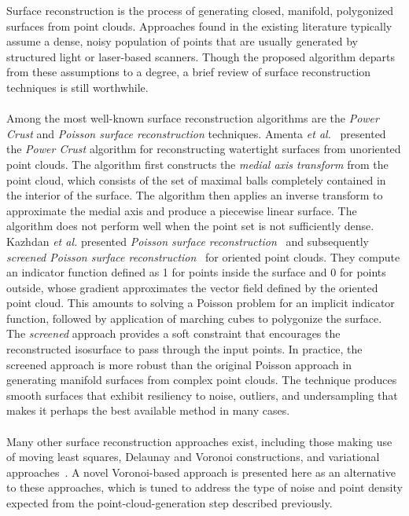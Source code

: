Surface reconstruction is the process of generating closed, manifold, polygonized surfaces from point clouds. Approaches found in the existing literature typically assume a dense, noisy population of points that are usually generated by structured light or laser-based scanners. Though the proposed algorithm departs from these assumptions to a degree, a brief review of surface reconstruction techniques is still worthwhile. \\ \\
%
Among the most well-known surface reconstruction algorithms are the \textit{Power Crust} and \textit{Poisson surface reconstruction} techniques. Amenta \textit{et al.}~\cite{amenta_2001} presented the \textit{Power Crust} algorithm for reconstructing watertight surfaces from unoriented point clouds. The algorithm first constructs the \textit{medial axis transform} from the point cloud, which consists of the set of maximal balls completely contained in the interior of the surface. The algorithm then applies an inverse transform to approximate the medial axis and produce a piecewise linear surface. The algorithm does not perform well when the point set is not sufficiently dense. Kazhdan \textit{et al.} presented \textit{Poisson surface reconstruction}~\cite{kazhdan_2008} and subsequently \textit{screened Poisson surface reconstruction}~\cite{kazhdan_2013} for oriented point clouds. They compute an indicator function defined as 1 for points inside the surface and 0 for points outside, whose gradient approximates the vector field defined by the oriented point cloud. This amounts to solving a Poisson problem for an implicit indicator function, followed by application of marching cubes to polygonize the surface. The \textit{screened} approach provides a soft constraint that encourages the reconstructed isosurface to pass through the input points. In practice, the screened approach is more robust than the original Poisson approach in generating manifold surfaces from complex point clouds. The technique produces smooth surfaces that exhibit resiliency to noise, outliers, and undersampling that makes it perhaps the best available method in many cases. \\ \\
%
Many other surface reconstruction approaches exist, including those making use of moving least squares, Delaunay and Voronoi constructions, and variational approaches~\cite{berger}. A novel Voronoi-based approach is presented here as an alternative to these approaches, which is tuned to address the type of noise and point density expected from the point-cloud-generation step described previously. \\ \\
